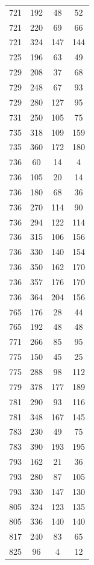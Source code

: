 \documentclass[12pt]{amsproc} %
\theoremstyle{definition}\newtheorem{defn}[thm]{Definition}
\theoremstyle{definition}\newtheorem{rem}[thm]{Remark}
\theoremstyle{definition}\newtheorem{ex}[thm]{Example}
\begin{document}
\begin{table}[ht!]
    \centering
    \begin{minipage}{0.25\textwidth}
        \centering
        \begin{tabular}{c|c|c|c} 
      721&192&48&52\\ 
      721&220&69&66\\ 
      721&324&147&144\\
      725&196&63&49\\ 
      729&208&37&68\\ 
      729&248&67&93\\ 
      729&280&127&95\\ 
      731&250&105&75\\ 
      735&318&109&159\\ 
      735&360&172&180\\ 
      736&60&14&4\\ 
      736&105&20&14\\ 
      736&180&68&36\\ 
      736&270&114&90\\ 
      736&294&122&114\\ 
      736&315&106&156\\ 
      736&330&140&154\\ 
      736&350&162&170\\ 
      736&357&176&170\\ 
      736&364&204&156\\ 
      765&176&28&44\\ 
      765&192&48&48\\ 
      771&266&85&95\\ 
      775&150&45&25\\ 
      775&288&98&112\\ 
      779&378&177&189\\ 
      781&290&93&116\\ 
      781&348&167&145\\ 
      783&230&49&75\\ 
      783&390&193&195\\ 
      793&162&21&36\\ 
      793&280&87&105\\ 
      793&330&147&130\\ 
      805&324&123&135\\
      805&336&140&140\\ 
      817&240&83&65\\ 
      825&96&4&12\\ 

\end{tabular}
\end{minipage}
\end{table}
\end{document}
